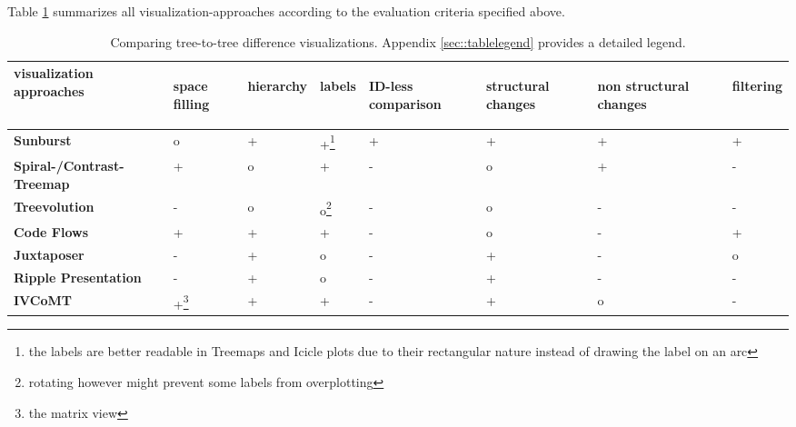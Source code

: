 Table \ref{chap5:comparison} summarizes all visualization-approaches according to the evaluation criteria specified above.

\begin{table}[tb]
\begin{minipage}{\linewidth}
\centering 
\begin{tabularx}{0.8\textwidth}{|l|>{\centering\arraybackslash}X|>{\centering\arraybackslash}X|>{\centering\arraybackslash}X|>{\centering\arraybackslash}X|>{\centering\arraybackslash}X|>{\centering\arraybackslash}X|>{\centering\arraybackslash}X|} 
\hline
\centering\textbf{visualization approaches} & \begin{sideways}\textbf{space filling}\end{sideways} & \begin{sideways}\textbf{hierarchy}\end{sideways} & \begin{sideways}\textbf{labels}\end{sideways} & \begin{sideways}\textbf{ID-less comparison}\end{sideways} & \begin{sideways}\textbf{structural changes}\end{sideways} & \begin{sideways}\textbf{non structural changes\ }\end{sideways} & \begin{sideways}\textbf{filtering}\end{sideways}\\
\hline
\hline
\textbf{Sunburst} & o & + & +\footnote{the labels are better readable in Treemaps and Icicle plots due to their rectangular nature instead of drawing the label on an arc} & + & + & + & +\\
\hline
\textbf{Spiral-/Contrast-Treemap} & + & o & + & - & o & + & -\\
\hline
\textbf{Treevolution} & - & o & o\footnote{rotating however might prevent some labels from overplotting} & - & o & - & -\\
\hline
\textbf{Code Flows} & + & + & + & - & o & - & +\\
\hline
\textbf{Juxtaposer} & - & + & o & - & + & - & o \\
\hline
\textbf{Ripple Presentation} & - & + & o & - & + & - & -\\
\hline
\textbf{IVCoMT} & +\footnote{the matrix view} & + & + & - & + & o & -\\
\hline
\end{tabularx}
\label{chap5:comparison}
\vspace{0.5em} 
\caption{Comparing tree-to-tree difference visualizations. Appendix \ref{sec::tablelegend} provides a detailed legend.}
\end{minipage}
\end{table}

